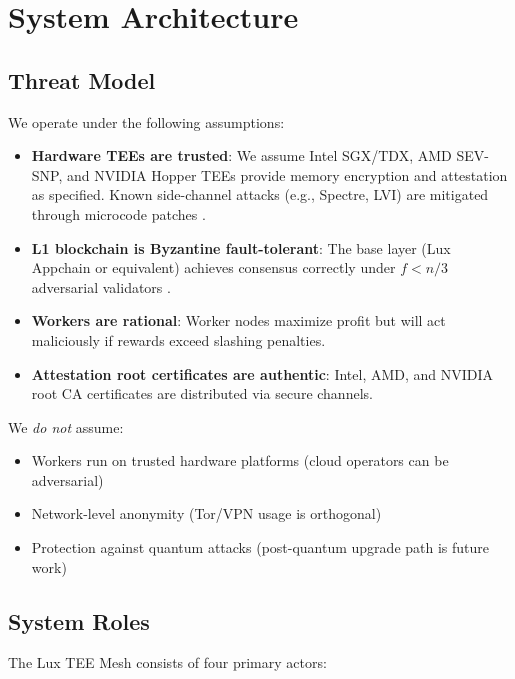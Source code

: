 \section{System Architecture}


\subsection{Threat Model}

We operate under the following assumptions:

\begin{itemize}
  \item \textbf{Hardware TEEs are trusted}: We assume Intel SGX/TDX, AMD SEV-SNP, and NVIDIA Hopper TEEs provide memory encryption and attestation as specified. Known side-channel attacks (e.g., Spectre, LVI) are mitigated through microcode patches \cite{sgx-attacks}.

  \item \textbf{L1 blockchain is Byzantine fault-tolerant}: The base layer (Lux Appchain or equivalent) achieves consensus correctly under $f < n/3$ adversarial validators \cite{avalanche-consensus}.

  \item \textbf{Workers are rational}: Worker nodes maximize profit but will act maliciously if rewards exceed slashing penalties.

  \item \textbf{Attestation root certificates are authentic}: Intel, AMD, and NVIDIA root CA certificates are distributed via secure channels.
\end{itemize}

We \textit{do not} assume:
\begin{itemize}
  \item Workers run on trusted hardware platforms (cloud operators can be adversarial)
  \item Network-level anonymity (Tor/VPN usage is orthogonal)
  \item Protection against quantum attacks (post-quantum upgrade path is future work)
\end{itemize}

\subsection{System Roles}

The Lux TEE Mesh consists of four primary actors:

